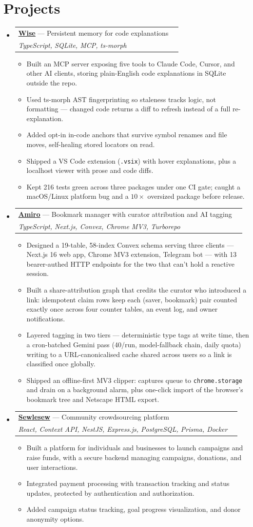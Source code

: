 \documentclass[letterpaper,11pt]{article}
\makeatletter
\newcommand{\resumeItem}[1]{
  \item\small{
    {#1 \vspace{-2pt}}
  }
}
\newcommand{\resumeProject}[4]{
  \vspace{-2pt}\item
    \begin{tabular*}{0.97\textwidth}[t]{l@{\extracolsep{\fill}}r}
      \textbf{\href{#2}{\underline{#1}}} --- \small#3 & \\
      \textit{\small#4} & \\
    \end{tabular*}\vspace{-7pt}
}
\newcommand{\resumeSubHeadingListStart}{\begin{itemize}[leftmargin=0.15in, label={}]}
\newcommand{\resumeSubHeadingListEnd}{\end{itemize}}
\newcommand{\resumeItemListStart}{\begin{itemize}}
\newcommand{\resumeItemListEnd}{\end{itemize}\vspace{-5pt}}
\makeatother
\begin{document}
\section{Projects}
  \resumeSubHeadingListStart
    \resumeProject
      {Wise}{https://wise.kaleab.site}{Persistent memory for code explanations}
      {TypeScript, SQLite, MCP, ts-morph}
      \resumeItemListStart
        \resumeItem{Built an MCP server exposing five tools to Claude Code, Cursor, and other AI clients, storing plain-English code explanations in SQLite outside the repo.}
        \resumeItem{Used ts-morph AST fingerprinting so staleness tracks logic, not formatting --- changed code returns a diff to refresh instead of a full re-explanation.}
        \resumeItem{Added opt-in in-code anchors that survive symbol renames and file moves, self-healing stored locators on read.}
        \resumeItem{Shipped a VS Code extension (\texttt{.vsix}) with hover explanations, plus a localhost viewer with prose and code diffs.}
        \resumeItem{Kept 216 tests green across three packages under one CI gate; caught a macOS/Linux platform bug and a $10\times$ oversized package before release.}
      \resumeItemListEnd
    \resumeProject
      {Amiro}{https://amiro-web.vercel.app}{Bookmark manager with curator attribution and AI tagging}
      {TypeScript, Next.js, Convex, Chrome MV3, Turborepo}
      \resumeItemListStart
        \resumeItem{Designed a 19-table, 58-index Convex schema serving three clients --- Next.js 16 web app, Chrome MV3 extension, Telegram bot --- with 13 bearer-authed HTTP endpoints for the two that can't hold a reactive session.}
        \resumeItem{Built a share-attribution graph that credits the curator who introduced a link: idempotent claim rows keep each (saver, bookmark) pair counted exactly once across four counter tables, an event log, and owner notifications.}
        \resumeItem{Layered tagging in two tiers --- deterministic type tags at write time, then a cron-batched Gemini pass (40/run, model-fallback chain, daily quota) writing to a URL-canonicalised cache shared across users so a link is classified once globally.}
        \resumeItem{Shipped an offline-first MV3 clipper: captures queue to \texttt{chrome.storage} and drain on a background alarm, plus one-click import of the browser's bookmark tree and Netscape HTML export.}
      \resumeItemListEnd
    \resumeProject
      {Sewlesew}{https://sewlesew.vercel.app}{Community crowdsourcing platform}
      {React, Context API, NestJS, Express.js, PostgreSQL, Prisma, Docker}
      \resumeItemListStart
        \resumeItem{Built a platform for individuals and businesses to launch campaigns and raise funds, with a secure backend managing campaigns, donations, and user interactions.}
        \resumeItem{Integrated payment processing with transaction tracking and status updates, protected by authentication and authorization.}
        \resumeItem{Added campaign status tracking, goal progress visualization, and donor anonymity options.}
      \resumeItemListEnd
  \resumeSubHeadingListEnd
\end{document}
